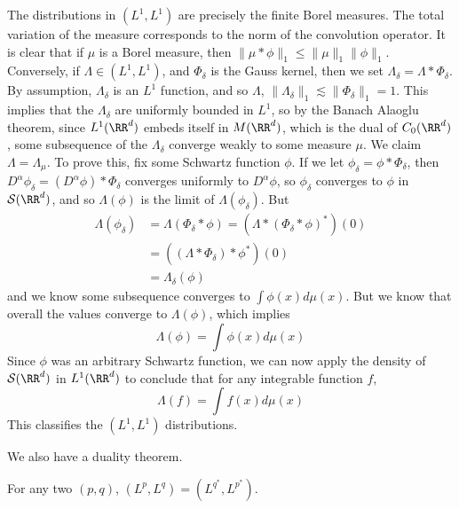 \begin{example}
	The distributions in $(L^1, L^1)$ are precisely the finite Borel measures. The total variation of the measure corresponds to the norm of the convolution operator. It is clear that if $\mu$ is a Borel measure, then $\| \mu * \phi \|_1 \leq \| \mu \|_1 \| \phi \|_1$. Conversely, if $\Lambda \in (L^1, L^1)$, and $\Phi_\delta$ is the Gauss kernel, then we set $\Lambda_\delta = \Lambda * \Phi_\delta$. By assumption, $\Lambda_\delta$ is an $L^1$ function, and so $\Lambda$, $\| \Lambda_\delta \|_1 \lesssim \| \Phi_\delta \|_1 = 1$. This implies that the $\Lambda_\delta$ are uniformly bounded in $L^1$, so by the Banach Alaoglu theorem, since $L^1(\RR^d)$ embeds itself in $M(\RR^d)$, which is the dual of $C_0(\RR^d)$, some subsequence of the $\Lambda_\delta$ converge weakly to some measure $\mu$. We claim $\Lambda = \Lambda_\mu$. To prove this, fix some Schwartz function $\phi$. If we let $\phi_\delta = \phi * \Phi_\delta$, then $D^\alpha \phi_\delta = (D^\alpha \phi) * \Phi_\delta$ converges uniformly to $D^\alpha \phi$, so $\phi_\delta$ converges to $\phi$ in $\mathcal{S}(\RR^d)$, and so $\Lambda(\phi)$ is the limit of $\Lambda(\phi_\delta)$. But
	\begin{align*}
		\Lambda(\phi_\delta) &= \Lambda(\Phi_\delta * \phi) = (\Lambda * (\Phi_\delta * \phi)^*)(0)\\
		&= ((\Lambda * \Phi_\delta) * \phi^*)(0)\\
		&= \Lambda_\delta(\phi)
	\end{align*}
	and we know some subsequence converges to $\int \phi(x) d\mu(x)$. But we know that overall the values converge to $\Lambda(\phi)$, which implies
	\[ \Lambda(\phi) = \int \phi(x) d\mu(x) \]
	Since $\phi$ was an arbitrary Schwartz function, we can now apply the density of $\mathcal{S}(\RR^d)$ in $L^1(\RR^d)$ to conclude that for any integrable function $f$,
	\[ \Lambda(f) = \int f(x) d\mu(x) \]
	This classifies the $(L^1, L^1)$ distributions.
\end{example}

We also have a duality theorem.

\begin{theorem}
	For any two $(p,q)$, $(L^p,L^q) = (L^{q^*}, L^{p^*})$.
\end{theorem}












